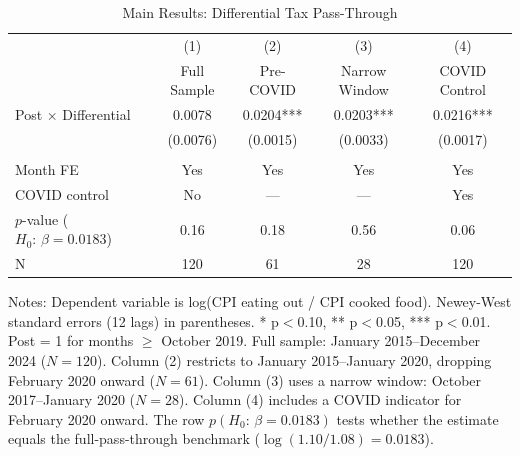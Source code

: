 \begin{table}[H]
\centering
\caption{Main Results: Differential Tax Pass-Through}
\begin{threeparttable}
\begin{tabular}{lcccc}
\toprule
 & (1) & (2) & (3) & (4) \\
 & Full Sample & Pre-COVID & Narrow Window & COVID Control \\
\midrule
Post $\times$ Differential & 0.0078 & 0.0204*** & 0.0203*** & 0.0216*** \\
 & (0.0076) & (0.0015) & (0.0033) & (0.0017) \\
\\
Month FE & Yes & Yes & Yes & Yes \\
COVID control & No & --- & --- & Yes \\
$p$-value ($H_0{:}\,\beta = 0.0183$) & 0.16 & 0.18 & 0.56 & 0.06 \\
N & 120 & 61 & 28 & 120 \\
\bottomrule
\end{tabular}
\begin{tablenotes}[flushleft]
\small
\item Notes: Dependent variable is log(CPI eating out / CPI cooked food). 
Newey-West standard errors (12 lags) in parentheses. 
* p$<$0.10, ** p$<$0.05, *** p$<$0.01. 
Post = 1 for months $\geq$ October 2019. 
Full sample: January 2015--December 2024 ($N = 120$). 
Column (2) restricts to January 2015--January 2020, dropping February 2020 onward ($N = 61$). 
Column (3) uses a narrow window: October 2017--January 2020 ($N = 28$). 
Column (4) includes a COVID indicator for February 2020 onward. 
The row $p(H_0{:}\,\beta = 0.0183)$ tests whether the estimate equals the full-pass-through 
benchmark ($\log(1.10/1.08) = 0.0183$).
\end{tablenotes}
\end{threeparttable}
\label{tab:main}
\end{table}
